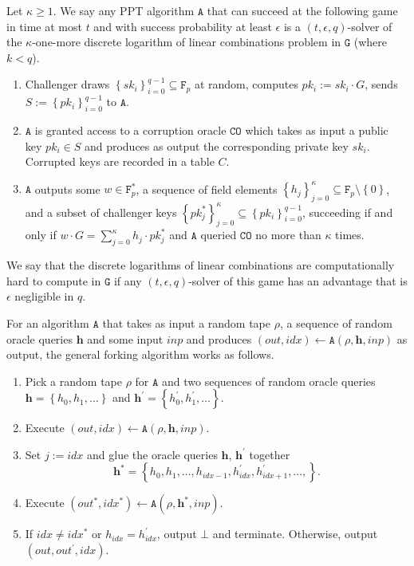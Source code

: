 \documentclass{llncs}
\newcommand{\A}{\texttt{A}}
\newcommand{\F}{\texttt{F}_p}
\newcommand{\G}{\texttt{G}}
\begin{document}
\begin{definition}\label{def:komdl}

Let $\kappa \geq 1$. We say any PPT algorithm $\A$ that can succeed at the following game in time at most $t$ and with success probability at least $\epsilon$ is a $(t, \epsilon, q)$-solver of the $\kappa$-one-more discrete logarithm of linear combinations problem in $\G$ (where $k < q$).
\begin{enumerate}
\item Challenger draws $\left\{sk_i\right\}_{i=0}^{q-1} \subseteq \F$ at random, computes $pk_i := sk_i \cdot G$, sends $S := \left\{pk_i\right\}_{i=0}^{q-1}$ to $\A$.

\item $\A$ is granted access to a corruption oracle $\texttt{CO}$ which takes as input a public key $pk_i \in S$ and produces as output the corresponding private key $sk_i$. Corrupted keys are recorded in a table $C$.

\item $\A$ outputs some $w \in \F^*$, a sequence of field elements $\left\{h_j\right\}_{j=0}^{\kappa} \subseteq \F \setminus \left\{0\right\}$, and a subset of challenger keys $\left\{pk^*_j\right\}_{j=0}^{\kappa} \subseteq \left\{pk_i\right\}_{i=0}^{q-1}$, succeeding if and only if $w \cdot G = \sum_{j=0}^{\kappa} h_j \cdot pk^*_j$ and
 $\A$ queried $\texttt{CO}$ no more than $\kappa$ times.

\end{enumerate}
We say that the discrete logarithms of linear combinations are computationally hard to compute in $\G$ if any $(t, \epsilon, q)$-solver of this game has an advantage  that is $\epsilon$ negligible in $q$.
\end{definition}

For an algorithm $\A$ that takes as input a random tape $\rho$, a sequence of random oracle queries $\textbf{h}$ and some input $inp$ and produces $(out, idx) \leftarrow \A(\rho, \textbf{h}, inp)$ as output, the general forking algorithm works as follows.

\begin{enumerate}[(1)]
\item  Pick a random tape $\rho$ for $\A$ and two sequences of random oracle queries $\textbf{h} = \left\{h_0, h_1, \ldots\right\}$ and $\textbf{h}^\prime = \left\{h_0^\prime, h_1^\prime, \ldots\right\}$.

\item Execute $(out, idx) \leftarrow \A(\rho, \textbf{h}, inp)$.

\item Set $j := idx$ and glue the oracle queries $\textbf{h}$, $\textbf{h}^\prime$ together \[\textbf{h}^* = \left\{h_0, h_1, \ldots, h_{idx - 1}, h_{idx}^\prime, h_{idx+1}^\prime, \ldots, \right\}.\]

\item Execute $(out^*, idx^*) \leftarrow \A(\rho, \textbf{h}^*, inp)$.

\item If $idx \neq idx^*$ or $h_{idx} = h_{idx}^\prime$, output $\bot$ and terminate. Otherwise, output $(out, out^\prime, idx)$.
\end{enumerate}
\end{document}

